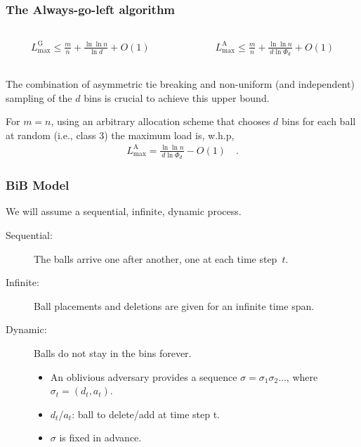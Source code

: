 \documentclass[serif,professionalfonts]{beamer}
\newcommand\load{L_{\mathrm{max}}}
\newcommand\loadG{\load^{\mathrm{G}}}
\newcommand\loadAgl{\load^{\mathrm{A}}}
\begin{document}
\begin{frame}
\frametitle{The Always-go-left algorithm}
\begin{columns}[onlytextwidth]
\begin{column}{0.5\textwidth}
\begin{align*}
\loadG \leq \frac{m}{n} + \frac{\ln \ln n}{\ln d} + O(1) 
\end{align*}
\end{column}
\begin{column}{0.5\textwidth}
\begin{align*}
\loadAgl \leq \frac{m}{n} + \frac{\ln \ln n}{d \ln \Phi_d} + O(1)
\end{align*}
\end{column}
\end{columns}
\bigskip
The combination of \alert{asymmetric tie breaking} and \alert{non-uniform} (and independent) sampling of the $d$ bins is crucial to achieve this upper bound.
\bigskip
\begin{theorem}[V\"ocking, 2003]
For $m=n$, using an arbitrary allocation scheme that chooses $d$ bins for each ball at random (i.e., class 3) the maximum load is, w.h.p,
\begin{align*}
\loadAgl = \frac{\ln \ln n}{d \ln \Phi_d} - O(1) \quad .
\end{align*}
\end{theorem}
\end{frame}

\begin{frame}
\frametitle{BiB Model}
We will assume a sequential, infinite, dynamic process.

\begin{description}
\item[Sequential:] The balls arrive one after another, one at each time step~$t$.
\item[Infinite:] Ball placements and deletions are given for an infinite time span.
\item[Dynamic:] Balls do not stay in the bins forever.
\begin{itemize}
\item An oblivious adversary provides a sequence $\sigma = \sigma_1 \sigma_2 \dots$, where $\sigma_t = (d_t, a_t)$.
\item $d_t$/$a_t$: ball to delete/add at time step t. \\
\item $\sigma$ is fixed in advance.
\end{itemize}
\end{description}
\end{frame}
\end{document}

